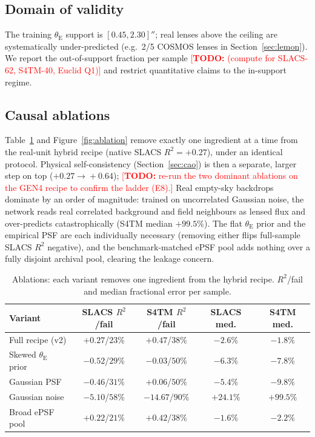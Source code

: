 \documentclass[fleqn,usenatbib]{mnras}
\newcommand{\thetaE}{\theta_{\mathrm{E}}}
\newcommand{\todo}[1]{\textcolor{red}{[\textbf{TODO:} #1]}}
\begin{document}
\subsection{Domain of validity}
The training $\thetaE$ support is $[0.45,2.30]''$; real lenses above the ceiling
are systematically under-predicted (e.g.\ 2/5 COSMOS lenses in
Section~\ref{sec:lemon}). We report the out-of-support fraction per sample
\todo{(compute for SLACS-62, S4TM-40, Euclid Q1)} and restrict quantitative
claims to the in-support regime.

\subsection{Causal ablations}
\label{sec:ablations}
Table~\ref{tab:ablation} and Figure~\ref{fig:ablation} remove exactly one
ingredient at a time from the real-unit hybrid recipe (native SLACS
$R^2=+0.27$), under an identical protocol.
Physical self-consistency (Section~\ref{sec:cao}) is then a separate, larger
step on top ($+0.27\!\rightarrow\!+0.64$); \todo{re-run the two dominant
ablations on the GEN4 recipe to confirm the ladder (E8).} Real empty-sky
backdrops dominate by an order of magnitude: trained on uncorrelated Gaussian
noise, the network reads real correlated background and field neighbours as
lensed flux and over-predicts catastrophically (S4TM median $+99.5\%$). The
flat $\thetaE$ prior and the empirical PSF are each individually necessary
(removing either flips full-sample SLACS $R^2$ negative), and the
benchmark-matched ePSF pool adds nothing over a fully disjoint archival pool,
clearing the leakage concern.

\begin{table}
\centering
\caption{Ablations: each variant removes one ingredient from the hybrid recipe.
$R^2$/fail and median fractional error per sample.}
\label{tab:ablation}
\begin{tabular}{lcccc}
\toprule
Variant & SLACS $R^2$/fail & S4TM $R^2$/fail & SLACS med. & S4TM med. \\
\midrule
Full recipe (v2)   & $+0.27$/$23\%$ & $+0.47$/$38\%$ & $-2.6\%$ & $-1.8\%$ \\
Skewed $\thetaE$ prior & $-0.52$/$29\%$ & $-0.03$/$50\%$ & $-6.3\%$ & $-7.8\%$ \\
Gaussian PSF       & $-0.46$/$31\%$ & $+0.06$/$50\%$ & $-5.4\%$ & $-9.8\%$ \\
Gaussian noise     & $-5.10$/$58\%$ & $-14.67$/$90\%$ & $+24.1\%$ & $+99.5\%$ \\
Broad ePSF pool    & $+0.22$/$21\%$ & $+0.42$/$38\%$ & $-1.6\%$ & $-2.2\%$ \\
\bottomrule
\end{tabular}
\end{table}
\end{document}
